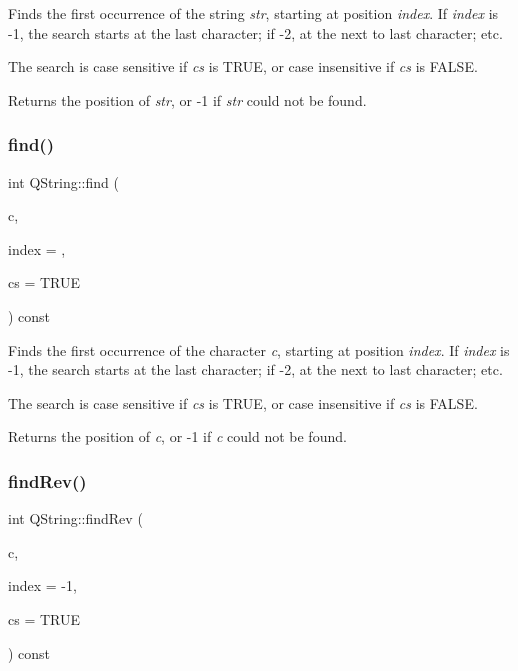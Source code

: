 Finds the first occurrence of the string {\itshape str}, starting at position {\itshape index}. If {\itshape index} is -\/1, the search starts at the last character; if -\/2, at the next to last character; etc.

The search is case sensitive if {\itshape cs} is T\+R\+UE, or case insensitive if {\itshape cs} is F\+A\+L\+SE.

Returns the position of {\itshape str}, or -\/1 if {\itshape str} could not be found. \mbox{\label{class_q_string_a675617012888ffd3acc8aef4aed05690}} 
\subsubsection{\texorpdfstring{find()}{find()}\hspace{0.1cm}{\footnotesize\ttfamily [5/5]}}
{\footnotesize\ttfamily int Q\+String\+::find (\begin{DoxyParamCaption}\item[{\mbox{\hyperlink{class_q_char}{Q\+Char}}}]{c,  }\item[{int}]{index = {},  }\item[{bool}]{cs = {\ttfamily TRUE} }\end{DoxyParamCaption}) const}

Finds the first occurrence of the character {\itshape c}, starting at position {\itshape index}. If {\itshape index} is -\/1, the search starts at the last character; if -\/2, at the next to last character; etc.

The search is case sensitive if {\itshape cs} is T\+R\+UE, or case insensitive if {\itshape cs} is F\+A\+L\+SE.

Returns the position of {\itshape c}, or -\/1 if {\itshape c} could not be found. \mbox{\label{class_q_string_aeb1cbae47f31c7f116751f45bf01d60a}} 
\subsubsection{\texorpdfstring{findRev()}{findRev()}\hspace{0.1cm}{\footnotesize\ttfamily [1/5]}}
{\footnotesize\ttfamily int Q\+String\+::find\+Rev (\begin{DoxyParamCaption}\item[{char}]{c,  }\item[{int}]{index = {\ttfamily -\/1},  }\item[{bool}]{cs = {\ttfamily TRUE} }\end{DoxyParamCaption}) const\hspace{0.3cm}{\ttfamily [inline]}}

